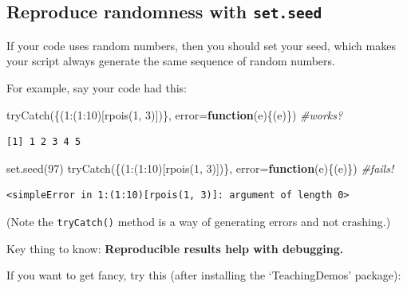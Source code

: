 \documentclass[
  letterpaper,
  DIV=11,
  numbers=noendperiod]{scrreprt}
\newenvironment{Shaded}{}{}
\newcommand{\AttributeTok}[1]{\textcolor[rgb]{0.49,0.56,0.16}{#1}}
\newcommand{\CommentTok}[1]{\textcolor[rgb]{0.38,0.63,0.69}{\textit{#1}}}
\newcommand{\ControlFlowTok}[1]{\textcolor[rgb]{0.00,0.44,0.13}{\textbf{#1}}}
\newcommand{\DecValTok}[1]{\textcolor[rgb]{0.25,0.63,0.44}{#1}}
\newcommand{\FunctionTok}[1]{\textcolor[rgb]{0.02,0.16,0.49}{#1}}
\newcommand{\NormalTok}[1]{#1}
\newcommand{\SpecialCharTok}[1]{\textcolor[rgb]{0.25,0.44,0.63}{#1}}
\begin{document}
\subsection{\texorpdfstring{Reproduce randomness with
\texttt{set.seed}}{Reproduce randomness with set.seed}}\label{reproduce-randomness-with-set.seed}

If your code uses random numbers, then you should set your seed, which
makes your script always generate the same sequence of random numbers.

For example, say your code had this:

\begin{Shaded}
\begin{Highlighting}[]
\FunctionTok{tryCatch}\NormalTok{(\{(}\DecValTok{1}\SpecialCharTok{:}\NormalTok{(}\DecValTok{1}\SpecialCharTok{:}\DecValTok{10}\NormalTok{)[}\FunctionTok{rpois}\NormalTok{(}\DecValTok{1}\NormalTok{, }\DecValTok{3}\NormalTok{)])\}, }\AttributeTok{error=}\ControlFlowTok{function}\NormalTok{(e)\{(e)\}) }\CommentTok{\#works?}
\end{Highlighting}
\end{Shaded}

\begin{verbatim}
[1] 1 2 3 4 5
\end{verbatim}

\begin{Shaded}
\begin{Highlighting}[]
\FunctionTok{set.seed}\NormalTok{(}\DecValTok{97}\NormalTok{)}
\FunctionTok{tryCatch}\NormalTok{(\{(}\DecValTok{1}\SpecialCharTok{:}\NormalTok{(}\DecValTok{1}\SpecialCharTok{:}\DecValTok{10}\NormalTok{)[}\FunctionTok{rpois}\NormalTok{(}\DecValTok{1}\NormalTok{, }\DecValTok{3}\NormalTok{)])\}, }\AttributeTok{error=}\ControlFlowTok{function}\NormalTok{(e)\{(e)\}) }\CommentTok{\#fails!}
\end{Highlighting}
\end{Shaded}

\begin{verbatim}
<simpleError in 1:(1:10)[rpois(1, 3)]: argument of length 0>
\end{verbatim}

(Note the \texttt{tryCatch()} method is a way of generating errors and
not crashing.)

Key thing to know: \textbf{Reproducible results help with debugging.}

If you want to get fancy, try this (after installing the `TeachingDemos'
package):
\end{document}
